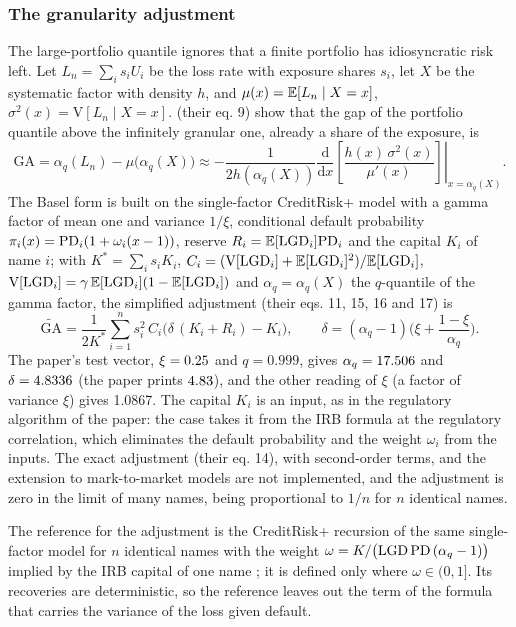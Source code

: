\subsubsection{The granularity adjustment}

The large-portfolio quantile ignores that a finite portfolio has idiosyncratic risk left. Let $L_n=\sum_is_iU_i$ be the loss rate with
exposure shares $s_i$, let $X$ be the systematic factor with density $h$, and $\mu(x)=\mathbb{E}[L_n\mid X=x]$, $\sigma^2(x)=\mathrm V[L_n\mid X=x]$.
\citet{credit-capital:gordylutkebohmert2013} (their eq. 9) show that the gap of the portfolio quantile above the infinitely granular one,
already a share of the exposure, is
\begin{equation}
\mathrm{GA}=\alpha_q(L_n)-\mu\big(\alpha_q(X)\big)\approx-\frac{1}{2h(\alpha_q(X))}\left.\frac{\mathrm d}{\mathrm dx}\left[\frac{h(x)\,\sigma^2(x)}{\mu'(x)}\right]\right|_{x=\alpha_q(X)}.
\label{eq:cc-ga-general}
\end{equation}
The Basel form is built on the single-factor CreditRisk+ model with a gamma factor of mean one and variance $1/\xi$, conditional default
probability $\pi_i(x)=\mathrm{PD}_i(1+\omega_i(x-1))$, reserve $R_i=\mathbb{E}[\mathrm{LGD}_i]\mathrm{PD}_i$ and the capital $K_i$ of name $i$; with
$K^{*}=\sum_is_iK_i$, $C_i=(\mathrm V[\mathrm{LGD}_i]+\mathbb{E}[\mathrm{LGD}_i]^2)/\mathbb{E}[\mathrm{LGD}_i]$, $\mathrm V[\mathrm{LGD}_i]=\gamma\,\mathbb{E}[\mathrm{LGD}_i](1-\mathbb{E}[\mathrm{LGD}_i])$ and
$\alpha_q=\alpha_q(X)$ the $q$-quantile of the gamma factor, the simplified adjustment (their eqs. 11, 15, 16 and 17) is
\begin{equation}
\widetilde{\mathrm{GA}}=\frac{1}{2K^{*}}\sum_{i=1}^{n}s_i^{2}\,C_i\big(\delta\,(K_i+R_i)-K_i\big),\qquad
\delta=(\alpha_q-1)\Big(\xi+\frac{1-\xi}{\alpha_q}\Big).
\label{eq:cc-ga}
\end{equation}
The paper's test vector, $\xi=0.25$ and $q=0.999$, gives $\alpha_q=17.506$ and $\delta=4.8336$ (the paper prints $4.83$), and
the other reading of $\xi$ (a factor of variance $\xi$) gives 1.0867. The capital $K_i$ is an input, as in the regulatory algorithm of the
paper: the case takes it from the IRB formula at the regulatory correlation, which eliminates the default probability and the weight
$\omega_i$ from the inputs. The exact adjustment (their eq. 14), with second-order terms, and the extension to mark-to-market models
\citep{credit-capital:gordymarrone2012} are not implemented, and the adjustment is zero in the limit of many names, being proportional to $1/n$ for $n$ identical names.

The reference for the adjustment is the CreditRisk+ recursion of the same single-factor model for $n$ identical names with the weight
$\omega=K/\big(\mathrm{LGD}\,\mathrm{PD}\,(\alpha_q-1)\big)$ implied by the IRB capital of one name \citep{credit-capital:gordylutkebohmert2013}; it is
defined only where $\omega\in(0,1]$. Its recoveries are deterministic, so the reference leaves out the term of the formula that carries the
variance of the loss given default.

